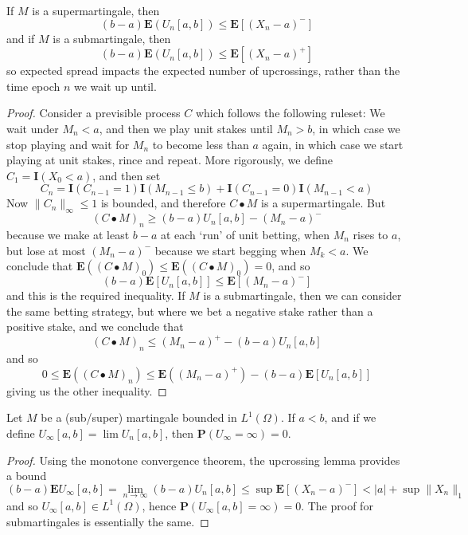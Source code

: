 \begin{theorem}
    If $M$ is a supermartingale, then
    \[ (b-a) \mathbf{E}(U_n[a,b]) \leq \mathbf{E}[(X_n - a)^-] \]
    and if $M$ is a submartingale, then
    \[ (b-a) \mathbf{E}(U_n[a,b]) \leq \mathbf{E}[(X_n - a)^+] \]
    so expected spread impacts the expected number of upcrossings, rather than the time epoch $n$ we wait up until.
\end{theorem}
\begin{proof}
    Consider a previsible process $C$ which follows the following ruleset: We wait under $M_n < a$, and then we play unit stakes until $M_n > b$, in which case we stop playing and wait for $M_n$ to become less than $a$ again, in which case we start playing at unit stakes, rince and repeat. More rigorously, we define $C_1 = \mathbf{I}(X_0 < a)$, and then set
    \[ C_n = \mathbf{I}(C_{n-1} = 1) \mathbf{I}(M_{n-1} \leq b) + \mathbf{I}(C_{n-1} = 0) \mathbf{I}(M_{n-1} < a) \]
    Now $\| C_n \|_\infty \leq 1$ is bounded, and therefore $C \bullet M$ is a supermartingale. But
    \[ (C \bullet M)_n \geq (b-a) U_n[a,b] - (M_n - a)^- \]
    because we make at least $b-a$ at each `run' of unit betting, when $M_n$ rises to $a$, but lose at most $(M_n - a)^-$ because we start begging when $M_k < a$. We conclude that $\mathbf{E}((C \bullet M)_0) \leq \mathbf{E}((C \bullet M)_0) = 0$, and so
    \[ (b-a) \mathbf{E}[U_n[a,b]] \leq \mathbf{E}[(M_n - a)^-] \]
    and this is the required inequality. If $M$ is a submartingale, then we can consider the same betting strategy, but where we bet a negative stake rather than a positive stake, and we conclude that
    \[ (C \bullet M)_n \leq (M_n - a)^+ -(b-a) U_n[a,b] \]
    and so
    \[ 0 \leq \mathbf{E}((C \bullet M)_n) \leq \mathbf{E}((M_n - a)^+) - (b-a) \mathbf{E}[U_n[a,b]] \]
    giving us the other inequality.
\end{proof}

\begin{corollary}
    Let $M$ be a (sub/super) martingale bounded in $L^1(\Omega)$. If $a < b$, and if we define $U_\infty[a,b] = \lim U_n[a,b]$, then $\mathbf{P}(U_\infty = \infty) = 0$.
\end{corollary}
\begin{proof}
    Using the monotone convergence theorem, the upcrossing lemma provides a bound
    \[ (b - a) \mathbf{E} U_\infty [a,b] = \lim_{n \to \infty} (b-a) U_n[a,b] \leq \sup \mathbf{E}[(X_n - a)^-] < |a| + \sup \| X_n \|_1 \]
    and so $U_\infty[a,b] \in L^1(\Omega)$, hence $\mathbf{P}(U_\infty[a,b] = \infty) = 0$. The proof for submartingales is essentially the same.
\end{proof}

